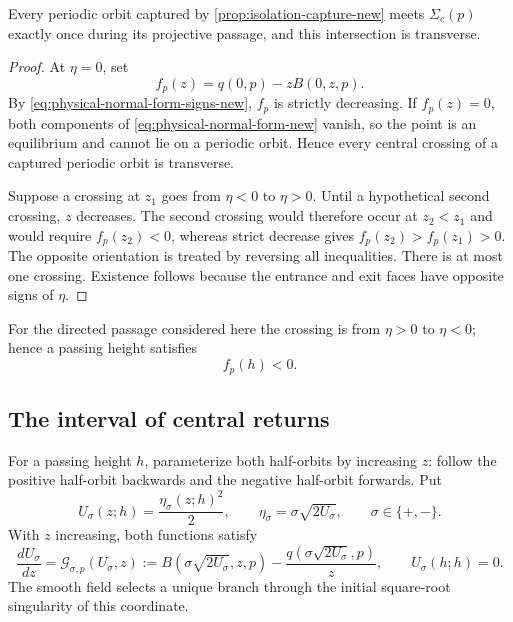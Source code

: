 \begin{lemma}
\label{lem:unique-central-crossing-new}
Every periodic orbit captured by \cref{prop:isolation-capture-new} meets
$\Sigma_c(p)$ exactly once during its projective passage, and this
intersection is transverse.
\end{lemma}

\begin{proof}
At $\eta=0$, set
\[
 f_p(z)=q(0,p)-zB(0,z,p).
\]
By \eqref{eq:physical-normal-form-signs-new}, $f_p$ is strictly decreasing.
If $f_p(z)=0$, both components of
\eqref{eq:physical-normal-form-new} vanish, so the point is an equilibrium
and cannot lie on a periodic orbit.  Hence every central crossing of a
captured periodic orbit is transverse.

Suppose a crossing at $z_1$ goes from $\eta<0$ to $\eta>0$.  Until a
hypothetical second crossing, $z$ decreases.  The second crossing would
therefore occur at $z_2<z_1$ and would require $f_p(z_2)<0$, whereas strict
decrease gives $f_p(z_2)>f_p(z_1)>0$.  The opposite orientation is treated
by reversing all inequalities.  There is at most one crossing.  Existence
follows because the entrance and exit faces have opposite signs of $\eta$.
\end{proof}

For the directed passage considered here the crossing is from $\eta>0$ to
$\eta<0$; hence a passing height satisfies
\begin{equation}
\label{eq:central-passing-condition-new}
 f_p(h)<0.
\end{equation}

\subsection{The interval of central returns}

For a passing height $h$, parameterize both half-orbits by increasing
$z$: follow the positive half-orbit backwards and the negative half-orbit
forwards. Put
\begin{equation}
\label{eq:squared-graph-new}
 U_\sigma(z;h)=\frac{\eta_\sigma(z;h)^2}{2},\qquad
 \eta_\sigma=\sigma\sqrt{2U_\sigma},\qquad
 \sigma\in\{+,-\}.
\end{equation}
With $z$ increasing, both functions satisfy
\begin{equation}
\label{eq:physical-graph-equation-new}
 \frac{dU_\sigma}{dz}
 =\mathcal G_{\sigma,p}(U_\sigma,z)
 :=B(\sigma\sqrt{2U_\sigma},z,p)
   -\frac{q(\sigma\sqrt{2U_\sigma},p)}{z},
 \qquad U_\sigma(h;h)=0.
\end{equation}
The smooth field selects a unique branch through the initial
square-root singularity of this coordinate.


